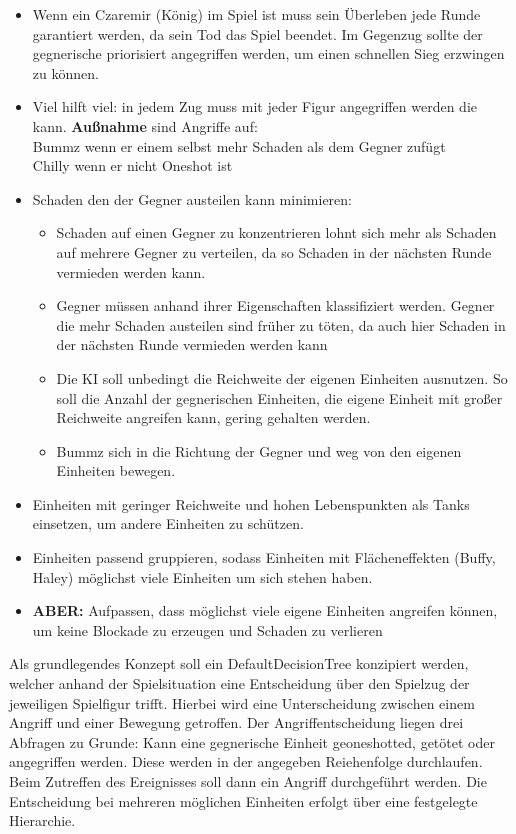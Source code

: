 \begin{itemize}
	\item Wenn ein Czaremir (König) im Spiel ist muss sein Überleben jede Runde garantiert werden, da sein Tod das Spiel beendet. Im Gegenzug sollte der gegnerische priorisiert angegriffen werden, um einen schnellen Sieg erzwingen zu können.
	\item Viel hilft viel: in jedem Zug muss mit jeder Figur angegriffen werden die kann. 
	\textbf{Außnahme} sind Angriffe auf:\\
	Bummz wenn er einem selbst mehr Schaden als dem Gegner zufügt\\
	Chilly wenn er nicht \glqq Oneshot\grqq{} ist
	\item Schaden den der Gegner austeilen kann minimieren:
	\begin{itemize}
		\item Schaden auf einen Gegner zu konzentrieren lohnt sich mehr als Schaden auf mehrere Gegner zu verteilen, da so Schaden in der nächsten Runde vermieden werden kann.
		\item Gegner müssen anhand ihrer Eigenschaften klassifiziert werden. Gegner die mehr Schaden austeilen sind früher zu töten, da auch hier Schaden in der nächsten Runde vermieden werden kann
		\item Die KI soll unbedingt die Reichweite der eigenen Einheiten ausnutzen. So soll die Anzahl der gegnerischen Einheiten, die eigene Einheit mit großer Reichweite angreifen kann, gering gehalten werden.
		\item Bummz sich in die Richtung der Gegner und weg von den eigenen Einheiten bewegen.
	\end{itemize}
	\item Einheiten mit geringer Reichweite und hohen Lebenspunkten als \glqq Tanks\grqq{} einsetzen, um andere Einheiten zu schützen.
	\item Einheiten passend gruppieren, sodass Einheiten mit Flächeneffekten (Buffy, Haley) möglichst viele Einheiten um sich stehen haben.
	\item \textbf{ABER:} Aufpassen, dass möglichst viele eigene Einheiten angreifen können, um keine Blockade zu erzeugen und Schaden zu \glqq verlieren\grqq{}
\end{itemize}

Als grundlegendes Konzept soll ein DefaultDecisionTree konzipiert werden, welcher anhand der Spielsituation eine Entscheidung über den Spielzug der jeweiligen Spielfigur trifft. Hierbei wird eine Unterscheidung zwischen einem Angriff und einer Bewegung getroffen. Der Angriffentscheidung liegen drei Abfragen zu Grunde: Kann eine gegnerische Einheit \glqq geoneshotted\grqq{}, getötet oder angegriffen werden. Diese werden in der angegeben Reiehenfolge durchlaufen. Beim Zutreffen des Ereignisses soll dann ein Angriff durchgeführt werden. Die Entscheidung bei mehreren möglichen Einheiten erfolgt über eine festgelegte Hierarchie.

